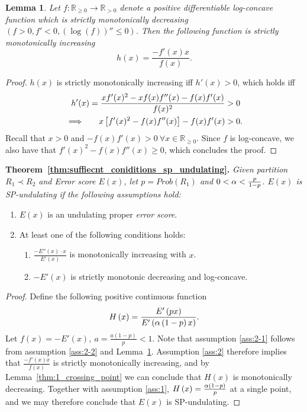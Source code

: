\documentclass{article}
\newcommand{\R}{\mathbb{R}}
\newcommand{\pR}{1}\newcommand{\rR}{2}\newcommand{\prR}{i}
\newcommand{\ahard}{a}
\newcommand{\psn}{\R_{\ge 0}}
\newcommand{\prn}{\R_{> 0}}
\newtheorem{lemma}{Lemma}
\begin{document}
\begin{lemma}
\label{thm:log-concave_is_monotinic}
Let $f:\psn\rightarrow\prn$ denote a positive differentiable log-concave function which is strictly monotonically decreasing $(f>0,f'<0,(\log(f))''\leq0)$. Then the following function is strictly monotonically increasing
\begin{equation*}
h(x)=\frac{-f'\left(x\right)x}{f\left(x\right)}.
\end{equation*}
\end{lemma}
\begin{proof}
$h(x)$ is strictly monotonically increasing iff $h'(x)>0$, which holds iff
\begin{align*}
h'(x)=\frac{xf'(x)^2-xf(x)f''(x)-f(x)f'(x)}{f(x)^2}&>0\\
\implies \quad \hspace{0.18cm} x\left[f'(x)^2-f(x)f''(x)\right]-f(x)f'(x)&>0.\\
\end{align*}
Recall that $x>0$ and $-f(x)f'(x)>0~\forall x\in \psn$. Since $f$ is log-concave, we also have that $f'(x)^2-f(x)f''(x)\geq0$, which concludes the proof.
\end{proof}

\noindent
{\textbf{Theorem~\ref{thm:suffiecnt_coniditions_sp_undulating}.} \textit{Given partition $R_\pR\prec R_\rR$ and Error score $E(x)$, let $p=Prob(R_\pR)$ and $0<\alpha<\frac{p}{1-p}$.  $E(x)$ is SP-undulating if the following assumptions hold:}
\begin{enumerate}\item $E(x)$ is an undulating proper \emph{error score}.
\label{ass:1}
\item At least one of the following conditions holds:
\label{ass:2}
\begin{enumerate}
\item \label{ass:2-1}
$\frac{-E''\left(x\right)\cdot x}{E'\left(x\right)}$ is
monotonically increasing with $x$.
\item \label{ass:2-2}
$-E'(x)$ is strictly monotonic decreasing and log-concave. 
\end{enumerate}

\end{enumerate}
}

\begin{proof}
Define the following positive continuous function
\begin{equation*}
H\left(x\right)=\frac{E'\left(px\right)}{E'\left(\alpha\left(1-p\right)x\right)}.
\end{equation*}
Let $f(x)=-E'(x), ~a=\frac{\ahard(1-p)}{p}<1$. Note that assumption \ref{ass:2-1} follows from assumption \ref{ass:2-2} and Lemma~\ref{thm:log-concave_is_monotinic}.
Assumption \ref{ass:2} therefore implies that $\frac{-f'(x)x}{f(x)}$ is strictly monotonically increasing, and by Lemma~\ref{thm:1_crossing_point} we can conclude that $H(x)$ is monotonically decreasing. Together with assumption \ref{ass:1}, $H\left(x\right)=\frac{\alpha\left(1-p\right)}{p}$ at a single point, and we may therefore conclude that $E(x)$ is SP-undulating.
\end{proof}
\end{document}
